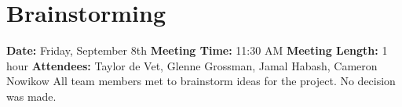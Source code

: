 \section{Brainstorming}
\textbf{Date:} Friday, September 8th
\newline
\textbf{Meeting Time:} 11:30 AM
\newline
\textbf{Meeting Length:} 1 hour
\newline
\textbf{Attendees:} Taylor de Vet, Glenne Grossman, Jamal Habash, Cameron Nowikow
\newline
\newline
All team members met to brainstorm ideas for the project. No decision was made.
